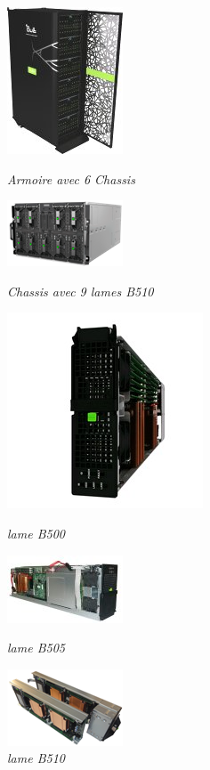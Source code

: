 \documentclass[11pt]{article}
\begin{document}
			\begin{figure}[h!]
			\begin{minipage}[b]{0.18\linewidth}
			\centering \includegraphics[scale=2]{armoire.jpg}
			\caption{\it \small{Armoire avec 6 Chassis}}
			\end{minipage}\hfill
			\begin{minipage}[b]{0.18\linewidth}
			\centering \includegraphics[scale=1]{chassis.png}
			\caption{\it \small{Chassis avec 9 lames B510}}
			\end{minipage}\hfill
			\begin{minipage}[b]{0.18\linewidth}
			\centering \includegraphics[scale=0.25]{bullxb0500.jpg}
			\caption{\it \small{lame B500}}
			\end{minipage}\hfill
			\begin{minipage}[b]{0.18\linewidth}
			\centering \includegraphics[scale=0.5]{bullxB505.jpg}
			\caption{\it \small{lame B505}}
			\end{minipage}\hfill
			\begin{minipage}[b]{0.18\linewidth}
			\centering \includegraphics[scale=0.5]{bullxB510_separate.png}
			\caption{\it \small{lame B510}}
			\end{minipage}\hfill
			\end{figure}
\end{document}
